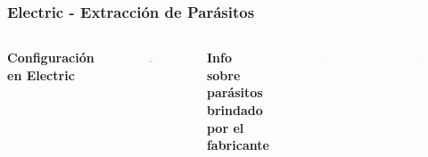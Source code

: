 \documentclass{beamer}
\begin{document}
\begin{frame}[fragile]
\frametitle{Electric - Extracción de Parásitos}
\begin{columns}[t] %
\textbf{Configuración en Electric}
\begin{figure}
\includegraphics[width=0.99\linewidth]{figuras/configuracionElectric-11a.eps}
\end{figure}

\textbf{Info sobre parásitos brindado por el fabricante}
\begin{figure}
\includegraphics[width=1\linewidth]{figuras/configuracionElectric-11b.eps}
\end{figure}
\vspace{-0.8cm}
\begin{figure}
\includegraphics[width=1\linewidth]{figuras/configuracionElectric-11c.eps}
\end{figure}


\end{columns}
\end{frame}
\end{document}
